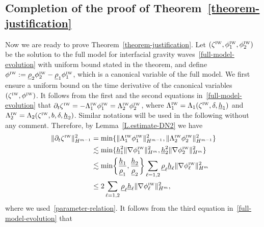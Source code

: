 \documentclass[11pt,leqno]{article}
\numberwithin{equation}{section}
\numberwithin{figure}{section}
\begin{document}
\subsection{Completion of the proof of Theorem~\ref{theorem-justification}}
%
Now we are ready to prove Theorem~\ref{theorem-justification}. 
Let $(\zeta^{\mbox{\rm\tiny IW}},\phi_1^{\mbox{\rm\tiny IW}},\phi_2^{\mbox{\rm\tiny IW}})$ be the solution to the full model 
for interfacial gravity waves~\eqref{full-model-evolution} with uniform bound stated in the theorem, and define 
${\phi^{\mbox{\rm\tiny IW}}:=\underline{\rho}_2\phi_2^{\mbox{\rm\tiny IW}}-\underline{\rho}_1\phi_1^{\mbox{\rm\tiny IW}}}$, 
which is a canonical variable of the full model. 
We first ensure a uniform bound on the time derivative of the canonical variables 
$(\zeta^{\mbox{\rm\tiny IW}},\phi^{\mbox{\rm\tiny IW}})$. 
It follows from the first and the second equations in~\eqref{full-model-evolution} that 
$\partial_t\zeta^{\mbox{\rm\tiny IW}}=-\Lambda_1^{\mbox{\rm\tiny IW}}\phi_1^{\mbox{\rm\tiny IW}}
=\Lambda_2^{\mbox{\rm\tiny IW}}\phi_2^{\mbox{\rm\tiny IW}}$, where 
$\Lambda_1^{\mbox{\rm\tiny IW}}=\Lambda_1(\zeta^{\mbox{\rm\tiny IW}},\delta,\underline{h}_1)$ and 
$\Lambda_2^{\mbox{\rm\tiny IW}}=\Lambda_2(\zeta^{\mbox{\rm\tiny IW}},b,\delta,\underline{h}_2)$. 
Similar notations will be used in the following without any comment. 
Therefore, by Lemma~\ref{L.estimate-DN2} we have 
%
\begin{align*}
\|\partial_t\zeta^{\mbox{\rm\tiny IW}}\|_{H^{m-1}}^2
&= \min\{ \|\Lambda_1^{\mbox{\rm\tiny IW}}\phi_1^{\mbox{\rm\tiny IW}}\|_{H^{m-1}}^2,
 \|\Lambda_2^{\mbox{\rm\tiny IW}}\phi_2^{\mbox{\rm\tiny IW}}\|_{H^{m-1}}^2 \} \\
&\lesssim \min\{ \underline{h}_1^2\|\nabla\phi_1^{\mbox{\rm\tiny IW}}\|_{H^m}^2,
 \underline{h}_2^2\|\nabla\phi_2^{\mbox{\rm\tiny IW}}\|_{H^m}^2 \} \\
&\lesssim \min\biggl\{ \frac{\underline{h}_1}{\underline{\rho}_1}, \frac{\underline{h}_2}{\underline{\rho}_2} \biggr\}
 \sum_{\ell=1,2} \underline{\rho}_\ell \underline{h}_\ell \|\nabla\phi_\ell^{\mbox{\rm\tiny IW}}\|_{H^m}^2 \\
&\leq 2\sum_{\ell=1,2} \underline{\rho}_\ell \underline{h}_\ell \|\nabla\phi_\ell^{\mbox{\rm\tiny IW}}\|_{H^m}^2,
\end{align*}
%
where we used~\eqref{parameter-relation}. 
It follows from the third equation in~\eqref{full-model-evolution} that 
%
\end{document}

